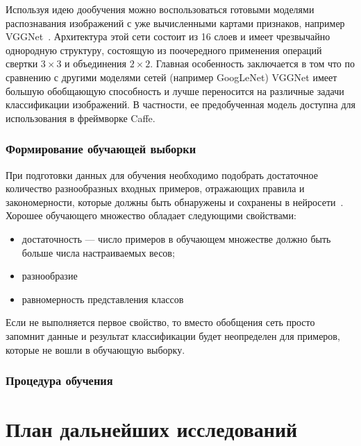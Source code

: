 \documentclass[a4paper,14pt]{extarticle} %
\begin{document}
Используя идею дообучения можно воспользоваться готовыми моделями распознавания изображений с уже вычисленными картами признаков, например VGGNet~\cite{VGGNet}. Архитектура этой сети состоит из 16 слоев и имеет чрезвычайно однородную структуру, состоящую из поочередного применения операций свертки $3 \times 3$ и объединения $2 \times 2$. Главная особенность заключается в том что по сравнению с другими моделями сетей (например GoogLeNet) VGGNet имеет большую обобщающую способность и лучше переносится на различные задачи классификации изображений. В частности, ее предобученная модель доступна для использования в фреймворке Caffe.

\subsubsection{Формирование обучающей выборки}
\hspace{\parindent} При подготовки данных для обучения необходимо подобрать достаточное количество разнообразных входных примеров, отражающих правила и закономерности, которые должны быть обнаружены и сохранены в нейросети~\cite{TrainingData}. Хорошее обучающего множество обладает следующими свойствами:

\begin{itemize}
\item достаточность --- число примеров в обучающем множестве должно быть больше числа настраиваемых весов;
\item разнообразие
\item равномерность представления классов
\end{itemize}

Если не выполняется первое свойство, то вместо обобщения сеть просто запомнит данные и результат классификации будет неопределен для примеров, которые не вошли в обучающую выборку.

\subsubsection{Процедура обучения}
\hspace{\parindent}

\section{План дальнейших исследований}
\hspace{\parindent} 

%
\newpage
\begin{flushleft}
\end{flushleft}
\end{document}
